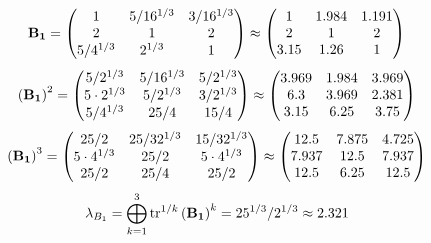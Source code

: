\documentclass[10pt,a4paper]{article}
\begin{document}
	\[
		\bold{B_1} = 
		\begin{pmatrix}
			{1}{} & {{5}} / {{16^ {1 / 3}}} & {{3}} / {{16^ {1 / 3}}} \\
			{{2}}{} & {1}{} & {{2}}{} \\
			{{5}} / {{4^ {1 / 3}}} & {{2^ {1 / 3}}}{} & {1}{} \\
		\end{pmatrix}
		\approx
		\begin{pmatrix}
			1        & 1.984    & 1.191    \\
			2        & 1        & 2        \\
			3.15     & 1.26     & 1        \\
		\end{pmatrix}
	\]
	\[
		\left(\bold{B_1}\right)^{2} = 
		\begin{pmatrix}
			{{5}} / {{2^ {1 / 3}}} & {{5}} / {{16^ {1 / 3}}} & {{5}} / {{2^ {1 / 3}}} \\
			{{5} \cdot {2^ {1 / 3}}}{} & {{5}} / {{2^ {1 / 3}}} & {{3}} / {{2^ {1 / 3}}} \\
			{{5}} / {{4^ {1 / 3}}} & {{25}} / {{4}} & {{15}} / {{4}} \\
		\end{pmatrix}
		\approx
		\begin{pmatrix}
			3.969    & 1.984    & 3.969    \\
			6.3      & 3.969    & 2.381    \\
			3.15     & 6.25     & 3.75     \\
		\end{pmatrix}
	\]
	\[
		\left(\bold{B_1}\right)^{3} = 
		\begin{pmatrix}
			{{25}} / {{2}} & {{25}} / {{32^ {1 / 3}}} & {{15}} / {{32^ {1 / 3}}} \\
			{{5} \cdot {4^ {1 / 3}}}{} & {{25}} / {{2}} & {{5} \cdot {4^ {1 / 3}}}{} \\
			{{25}} / {{2}} & {{25}} / {{4}} & {{25}} / {{2}} \\
		\end{pmatrix}
		\approx
		\begin{pmatrix}
			12.5     & 7.875    & 4.725    \\
			7.937    & 12.5     & 7.937    \\
			12.5     & 6.25     & 12.5     \\
		\end{pmatrix}
	\]
	\[
		\lambda_{B_1} =  \bigoplus ^{3} _{k = 1} \operatorname{tr} ^{1 / k} \left( \bold{B_1} \right)^k = {{25^ {1 / 3}}} / {{2^ {1 / 3}}}\approx 2.321
	\]
\end{document}
